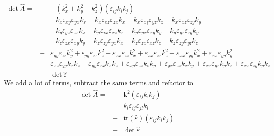\documentclass[12pt,a4paper,twoside,openright,BCOR10mm,headsepline,titlepage,abstracton,chapterprefix,final]{scrreprt}
\newcommand\Vector[1]{{\mathbf{#1}}}
\newcommand\wavenumber{k}
\newcommand\Wavevector{\Vector{\wavenumber}}
\newcommand\Tensor[1]{\hat{#1}}
\newcommand\permittivity{\Tensor{\scalarpermittivity}}
\newcommand\scalarpermittivity{\varepsilon}
\begin{document}
\begin{eqnarray}
 \det \hat{A} =&& 
   - ( \wavenumber_x^2 + \wavenumber_y^2 + \wavenumber_z^2 )
     ( \scalarpermittivity_{ij} \wavenumber_i \wavenumber_j )
 \nonumber\\
 &+& 
    - \wavenumber_x \scalarpermittivity_{xy} \scalarpermittivity_{yx} \wavenumber_x
    - \wavenumber_x \scalarpermittivity_{xz} \scalarpermittivity_{zx} \wavenumber_x
    - \wavenumber_x \scalarpermittivity_{xy} \scalarpermittivity_{yz} \wavenumber_z 
    - \wavenumber_x \scalarpermittivity_{xz} \scalarpermittivity_{zy} \wavenumber_y  
 \nonumber\\&+&
    - \wavenumber_y \scalarpermittivity_{yz} \scalarpermittivity_{zx} \wavenumber_x  
    - \wavenumber_y \scalarpermittivity_{yx} \scalarpermittivity_{xz} \wavenumber_z 
    - \wavenumber_y \scalarpermittivity_{yx} \scalarpermittivity_{xy} \wavenumber_y
    - \wavenumber_y \scalarpermittivity_{yz} \scalarpermittivity_{zy} \wavenumber_y
 \nonumber\\&+&
    - \wavenumber_z \scalarpermittivity_{zx} \scalarpermittivity_{xy} \wavenumber_y  
    - \wavenumber_z \scalarpermittivity_{zy} \scalarpermittivity_{yx} \wavenumber_x   
    - \wavenumber_z \scalarpermittivity_{zx} \scalarpermittivity_{xz} \wavenumber_z 
    - \wavenumber_z \scalarpermittivity_{zy} \scalarpermittivity_{yz} \wavenumber_z 
 \nonumber\\&+&    
      \scalarpermittivity_{yy} \scalarpermittivity_{zz} \wavenumber_y^2 
    + \scalarpermittivity_{yy} \scalarpermittivity_{zz} \wavenumber_z^2 
    + \scalarpermittivity_{xx} \scalarpermittivity_{zz} \wavenumber_x^2 
    + \scalarpermittivity_{xx} \scalarpermittivity_{zz} \wavenumber_z^2 
    + \scalarpermittivity_{xx} \scalarpermittivity_{yy} \wavenumber_x^2 
    + \scalarpermittivity_{xx} \scalarpermittivity_{yy} \wavenumber_y^2
 \nonumber\\&+&    
      \scalarpermittivity_{xz} \scalarpermittivity_{yy} \wavenumber_x \wavenumber_z  
    + \scalarpermittivity_{yy} \scalarpermittivity_{zx} \wavenumber_x \wavenumber_z 
    + \scalarpermittivity_{xy} \scalarpermittivity_{zz} \wavenumber_x \wavenumber_y 
    + \scalarpermittivity_{yx} \scalarpermittivity_{zz} \wavenumber_x \wavenumber_y 
    + \scalarpermittivity_{xx} \scalarpermittivity_{yz} \wavenumber_y \wavenumber_z 
    + \scalarpermittivity_{xx} \scalarpermittivity_{zy} \wavenumber_y \wavenumber_z  
 \nonumber\\[2ex]
 &-& \det \permittivity 
\end{eqnarray}
We add a lot of terms, subtract the same terms and refactor to
\begin{eqnarray}
 \det \hat{A} =
 &-& 
     \Wavevector^2
     ( \scalarpermittivity_{ij} \wavenumber_i \wavenumber_j )
 \nonumber\\
 &-&
      \wavenumber_i \scalarpermittivity_{ij} \scalarpermittivity_{jl} \wavenumber_l
 \nonumber\\
 &+&
   \text{tr}(\permittivity) ( \scalarpermittivity_{ij} \wavenumber_i \wavenumber_j )
 \nonumber\\
 &-& \det \permittivity 
\end{eqnarray}
\end{document}
